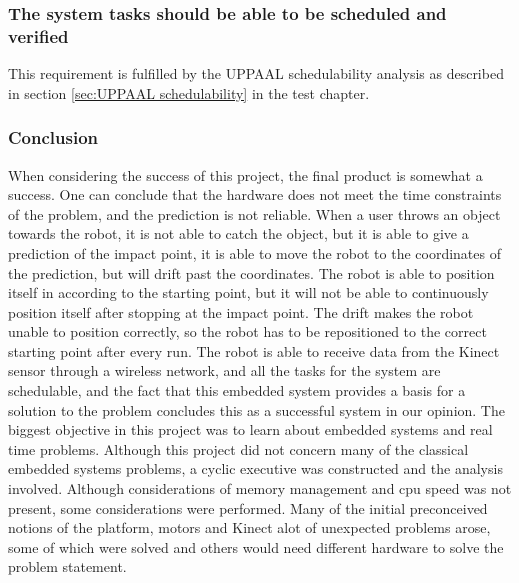 \subsubsection{The system tasks should be able to be scheduled and verified}
This requirement is fulfilled by the UPPAAL schedulability analysis as described in section \ref{sec:UPPAAL schedulability} in the test chapter.

\subsubsection{Conclusion}
When considering the success of this project, the final product is somewhat a success. One can conclude that the hardware does not meet the time constraints of the problem, and the prediction is not reliable. When a user throws an object towards the robot, it is not able to catch the object, but it is able to give a prediction of the impact point, it is able to move the robot to the coordinates of the prediction, but will drift past the coordinates. The robot is able to position itself in according to the starting point, but it will not be able to continuously position itself after stopping at the impact point. The drift makes the robot unable to position correctly, so the robot has to be repositioned to the correct starting point after every run.\newline
The robot is able to receive data from the Kinect sensor through a wireless network, and all the tasks for the system are schedulable, and the fact that this embedded system provides a basis for a solution to the problem concludes this as a successful system in our opinion.
The biggest objective in this project was to learn about embedded systems and real time problems. Although this project did not concern many of the classical embedded systems problems, a cyclic executive was constructed and the analysis involved. Although considerations of memory management and cpu speed was not present, some considerations were performed. Many of the initial preconceived notions of the platform, motors and Kinect alot of unexpected problems arose, some of which were solved and others would need different hardware to solve the problem statement.  